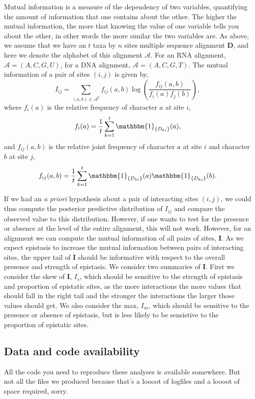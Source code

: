 \documentclass[11pt]{article}
\begin{document}
Mutual information is a measure of the dependency of two variables, quantifying the amount of information that one contains about the other.
The higher the mutual information, the more that knowing the value of one variable tells you about the other, in other words the more similar the two variables are.
As above, we assume that we have an $t$ taxa by $n$ sites multiple sequence alignment $\boldsymbol{D}$, and here we denote the alphabet of this alignment $\mathcal{A}$.
For an RNA alignment, $\mathcal{A} = (A,C,G,U)$, for a DNA alignment, $\mathcal{A} = (A,C,G,T)$.
The mutual information of a pair of sites $(i,j)$ is given by,
\[
I_{ij} = \sum_{(a,b)\in\mathcal{A}^2}f_{ij}(a,b)\log\left(\frac{f_{ij}(a,b)}{f_i(a)f_j(b)}\right),
\]
where $f_i(a)$ is the relative frequency of character $a$ at site $i$,
\[
f_i(a) = \frac{1}{t}\sum_{k=1}^{t}\mathbbm{1}_{\{D_{ki}\}}(a),
\]
and $f_{ij}(a,b)$ is the relative joint frequency of character $a$ at site $i$ and character $b$ at site $j$,
\[
f_{ij}(a,b) = \frac{1}{t}\sum_{k=1}^{t}\mathbbm{1}_{\{D_{ki}\}}(a) \mathbbm{1}_{\{D_{kj}\}}(b).
\]

If we had an \textit{a priori} hypothesis about a pair of interacting sites $(i,j)$, we could thus compute the posterior predictive distribution of $I_{ij}$ and compare the observed value to this distribution.
However, if one wants to test for the presence or absence at the level of the entire alignment, this will not work.
However, for an alignment we can compute the mutual information of all pairs of sites, $\boldsymbol{I}$.
As we expect epistasis to increase the mutual information between pairs of interacting sites, the upper tail of $\boldsymbol{I}$ should be informative with respect to the overall presence and strength of epistasis.
We consider two summaries of $\boldsymbol{I}$.
First we consider the skew of $\boldsymbol{I}$, $I_s$, which should be sensitive to the strength of epistasis and proportion of epistatic sites, as the more interactions the more values that should fall in the right tail and the stronger the interactions the larger those values should get.
We also consider the max, $I_m$, which should be sensitive to the presence or absence of epistasis, but is less likely to be sensistive to the proportion of epistatic sites.

\subsection*{Data and code availability\label{sec:its_on_github}}
All the code you need to reproduce these analyses is available somewhere.
But not all the files we produced because that's a loooot of logfiles and a loooot of space required, sorry.
\end{document}
